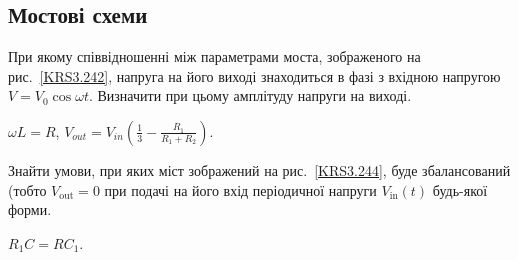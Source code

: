 \subsection*{Мостові схеми}

\begin{problem}\label{prb:KRS3.242}
При якому співвідношенні між параметрами моста, зображеного на рис.~\ref{KRS3.242}, напруга на його виході знаходиться в фазі з вхідною напругою $V = V_0\cos\omega t$. Визначити при цьому амплітуду напруги на виході.
\begin{solution}
	$\omega L = R$, $V_{out} = V_{in} \left( \frac13 - \frac{R_1}{R_1 + R_2}\right) $.
\end{solution}
\end{problem}

\begin{problem}\label{prb:KRS3.244}
Знайти умови,  при яких міст зображений на рис.~\ref{KRS3.244}, буде збалансований (тобто $V_{\mathrm{out}} = 0$ при подачі на його
вхід періодичної напруги $V_{\mathrm{in}}(t)$ будь-якої форми.
\begin{solution}
	$R_1C = RC_1$.
\end{solution}
\end{problem}

